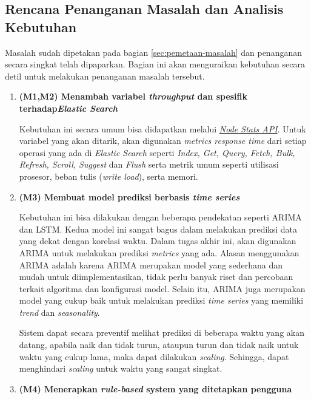 \subsection{Rencana Penanganan Masalah dan Analisis Kebutuhan}

Masalah sudah dipetakan pada bagian \ref{sec:pemetaan-masalah} dan penanganan secara singkat telah dipaparkan. Bagian ini akan menguraikan kebutuhan secara detil untuk melakukan penanganan masalah tersebut.

\begin{enumerate}
    \item \textbf{(M1,M2) Menambah variabel \textit{throughput} dan spesifik terhadap\textit{Elastic Search}}
    
    Kebutuhan ini secara umum bisa didapatkan melalui \href{https://www.elastic.co/guide/en/elasticsearch/reference/current/cluster-nodes-stats.html}{\textit{Node Stats API}}. Untuk variabel yang akan ditarik, akan digunakan \textit{metrics response time} dari setiap operasi yang ada di \textit{Elastic Search} seperti \textit{Index, Get, Query, Fetch, Bulk, Refresh, Scroll, Suggest} dan \textit{Flush} serta metrik umum seperti utilisasi prosesor, beban tulis (\textit{write load}), serta memori.

    \item \textbf{(M3) Membuat model prediksi berbasis \textit{time series}}
    
    Kebutuhan ini bisa dilakukan dengan beberapa pendekatan seperti ARIMA dan LSTM. Kedua model ini sangat bagus dalam melakukan prediksi data yang dekat dengan korelasi waktu. Dalam tugas akhir ini, akan digunakan ARIMA untuk melakukan prediksi \textit{metrics} yang ada. Alasan menggunakan ARIMA adalah karena ARIMA merupakan model yang sederhana dan mudah untuk diimplementasikan, tidak perlu banyak riset dan percobaan terkait algoritma dan konfigurasi model. Selain itu, ARIMA juga merupakan model yang cukup baik untuk melakukan prediksi \textit{time series} yang memiliki \textit{trend} dan \textit{seasonality}.

    Sistem dapat secara preventif melihat prediksi di beberapa waktu yang akan datang, apabila naik dan tidak turun, ataupun turun dan tidak naik untuk waktu yang cukup lama, maka dapat dilakukan \textit{scaling}. Sehingga, dapat menghindari \textit{scaling} untuk waktu yang sangat singkat.

    \item \textbf{(M4) Menerapkan \textit{rule-based} system yang ditetapkan pengguna}
    

\end{enumerate}
